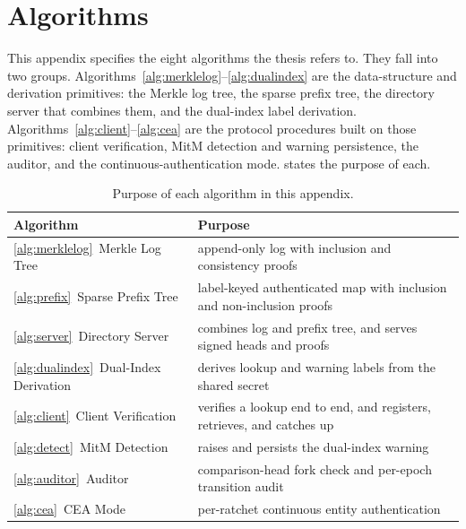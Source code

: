 \chapter{Algorithms}\label{app:algorithms}

\newcommand{\lself}{\ell_{\mathsf{self}}}
\newcommand{\lpeer}{\ell_{\mathsf{peer}}}
\newcommand{\lwarn}{\ell_{\mathsf{warn}}}
\SetAlFnt{\small}
\SetAlCapFnt{\small}
\SetAlCapNameFnt{\small}

This appendix specifies the eight algorithms the thesis refers to. They fall into two groups.
Algorithms~\ref{alg:merklelog}--\ref{alg:dualindex} are the data-structure and derivation
primitives: the Merkle log tree, the sparse prefix tree, the directory server that combines
them, and the dual-index label derivation. Algorithms~\ref{alg:client}--\ref{alg:cea} are the
protocol procedures built on those primitives: client verification, MitM detection and warning
persistence, the auditor, and the continuous-authentication mode.  states the
purpose of each.

\begin{table}[H]
\centering
\caption{Purpose of each algorithm in this appendix.}\label{tab:alg-purpose}
\small
\begin{tabular}{@{}ll@{}}
\toprule
Algorithm & Purpose \\
\midrule
\ref{alg:merklelog}~Merkle Log Tree & append-only log with inclusion and consistency proofs \\
\ref{alg:prefix}~Sparse Prefix Tree & label-keyed authenticated map with inclusion and non-inclusion proofs \\
\ref{alg:server}~Directory Server & combines log and prefix tree, and serves signed heads and proofs \\
\ref{alg:dualindex}~Dual-Index Derivation & derives lookup and warning labels from the shared secret \\
\ref{alg:client}~Client Verification & verifies a lookup end to end, and registers, retrieves, and catches up \\
\ref{alg:detect}~MitM Detection & raises and persists the dual-index warning \\
\ref{alg:auditor}~Auditor & comparison-head fork check and per-epoch transition audit \\
\ref{alg:cea}~CEA Mode & per-ratchet continuous entity authentication \\
\bottomrule
\end{tabular}
\end{table}

